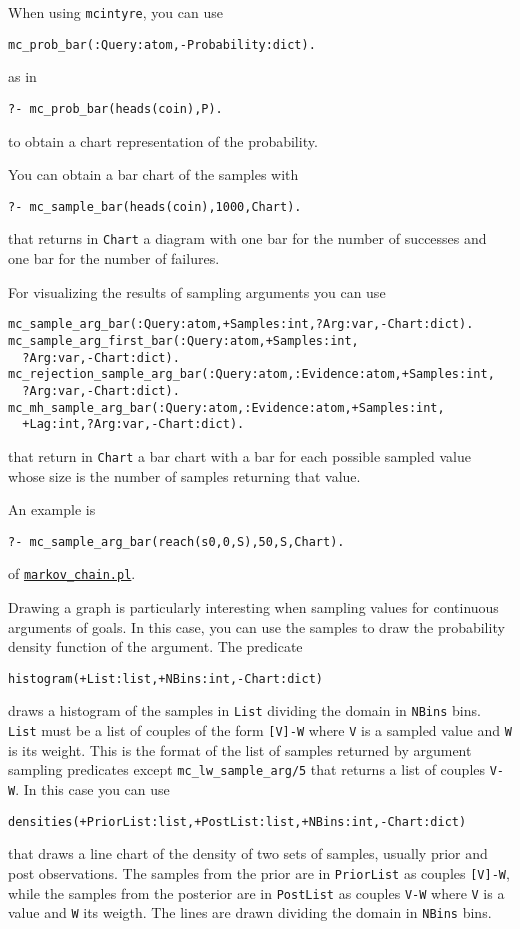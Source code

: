 When using \verb|mcintyre|, you can use
\begin{verbatim}
mc_prob_bar(:Query:atom,-Probability:dict).
\end{verbatim}
as in
\begin{verbatim}
?- mc_prob_bar(heads(coin),P).
\end{verbatim}
to obtain a chart representation of the probability.

You can obtain a bar chart of the samples with
\begin{verbatim}
?- mc_sample_bar(heads(coin),1000,Chart).
\end{verbatim}
that returns in \verb|Chart| a diagram with one bar for the number of successes and 
one bar for the number of failures.

For visualizing the results of sampling arguments you can use
\begin{verbatim}
mc_sample_arg_bar(:Query:atom,+Samples:int,?Arg:var,-Chart:dict).
mc_sample_arg_first_bar(:Query:atom,+Samples:int,
  ?Arg:var,-Chart:dict).
mc_rejection_sample_arg_bar(:Query:atom,:Evidence:atom,+Samples:int,
  ?Arg:var,-Chart:dict).
mc_mh_sample_arg_bar(:Query:atom,:Evidence:atom,+Samples:int,
  +Lag:int,?Arg:var,-Chart:dict).
\end{verbatim} 
that return in \verb|Chart| a bar chart with a bar for each possible sampled value whose size is the number of samples
returning that value.

An example is
\begin{verbatim}
?- mc_sample_arg_bar(reach(s0,0,S),50,S,Chart). 
\end{verbatim}
of \href{http://cplint.lamping.unife.it/example/inference/markov_chain.pl}{\texttt{markov\_chain.pl}}.

Drawing a graph is particularly interesting when
sampling values for continuous arguments of goals.
In this case, you can use the samples to draw the
probability density function of the argument.
The predicate
\begin{verbatim}
histogram(+List:list,+NBins:int,-Chart:dict) 
\end{verbatim}
draws a histogram of the samples in \verb|List| dividing the domain in
 \verb|NBins| bins.
\verb|List| must be a list of couples of the form \verb|[V]-W|
where \verb|V| is a sampled value and \verb|W| is its weight. This is the format of the list of samples returned by argument sampling predicates
except \verb|mc_lw_sample_arg/5| that returns a list of couples \verb|V-W|. 
In this case you can
use
\begin{verbatim}
densities(+PriorList:list,+PostList:list,+NBins:int,-Chart:dict)
\end{verbatim}
that draws a line chart of the density of two sets of samples, usually
 prior and post observations. The samples from the prior are in \verb|PriorList|
as couples \verb|[V]-W|, while the samples from the posterior are in \verb|PostList|
as couples \verb|V-W| where \verb|V| is a value and \verb|W| its weigth.
 The lines are drawn dividing the domain in
 \verb|NBins| bins.
 
